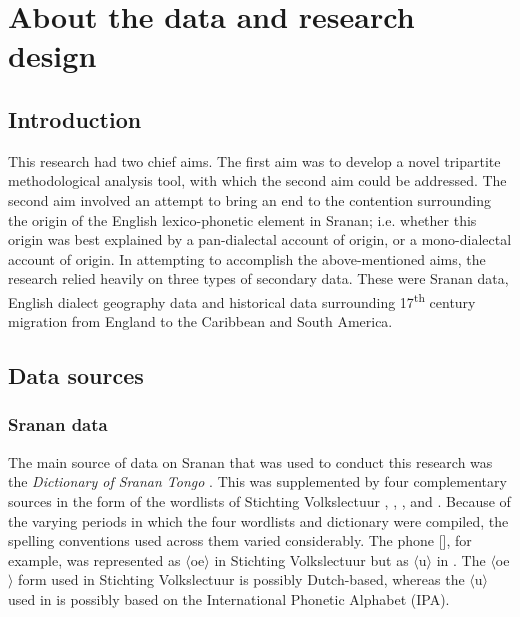 \chapter{About the data and research design}\label{ch:3}

\section{Introduction}
This research had two chief aims. The first aim was to develop a novel tripartite methodological analysis tool, with which the second aim could be addressed. The second aim involved an attempt to bring an end to the contention surrounding the origin of the English lexico-phonetic element in Sranan; i.e. whether this origin was best explained by a pan-dialectal account of origin, or a mono-dialectal account of origin. In attempting to accomplish the above-mentioned aims, the research relied heavily on three types of secondary data. These were Sranan data, English dialect geography data and historical data surrounding 17\textsuperscript{th} century migration from England to the Caribbean and South America.

\section{Data sources}\label{3.2}
\subsection{Sranan data} \label{3.2.1}
The main source of data on Sranan that was used to conduct this research was the \emph{Dictionary of Sranan Tongo} \citep{Wilner07, Wilner03, Wilner92}. This was supplemented by four complementary sources in the form of the wordlists of Stichting Volkslectuur \citep{Stichting80},  \citet{Schumann83}, \citet{Fermin69}, and \citet{Herlein18}. Because of the varying periods in which the four wordlists and dictionary were compiled, the spelling conventions used across them varied considerably. The phone [], for example, was represented as $\langle$oe$\rangle$ in Stichting Volkslectuur  \citep{Stichting80} but as $\langle$u$\rangle$ in  \citet{Wilner03}. The $\langle$oe$\rangle$ form used in Stichting Volkslectuur  \citep{Stichting80} is possibly Dutch-based, whereas the $\langle$u$\rangle$ used in  \citet{Wilner03} is possibly based on the International Phonetic Alphabet (IPA).

